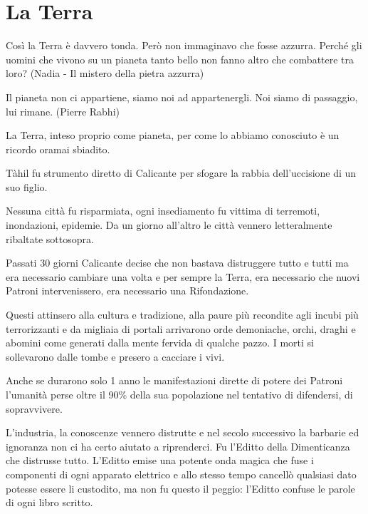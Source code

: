 \section{La Terra}

\begin{enfasi}{
Così la Terra è davvero tonda. Però non immaginavo che fosse azzurra. Perché gli uomini che vivono su un pianeta tanto bello non fanno altro che combattere tra loro? (Nadia - Il mistero della pietra azzurra)

\medskip

Il pianeta non ci appartiene, siamo noi ad appartenergli. Noi siamo di passaggio, lui rimane. (Pierre Rabhi)}\end{enfasi}

\begin{multicols}{2}

\label{terra}

La Terra, inteso proprio come pianeta, per come lo abbiamo conosciuto è un ricordo oramai sbiadito.

Tàhil fu strumento diretto di Calicante per sfogare la rabbia dell'uccisione di un suo figlio.

Nessuna città fu risparmiata, ogni insediamento fu vittima di terremoti, inondazioni, epidemie. Da un giorno all'altro le città vennero letteralmente ribaltate sottosopra.

Passati 30 giorni Calicante decise che non bastava distruggere tutto e tutti ma era necessario cambiare una volta e per sempre la Terra, era necessario che nuovi Patroni intervenissero, era necessario una Rifondazione.

Questi attinsero alla cultura e tradizione, alla paure più recondite agli incubi più terrorizzanti e da migliaia di portali arrivarono orde demoniache, orchi, draghi e abomini come generati dalla mente fervida di qualche pazzo. I morti si sollevarono dalle tombe e presero a cacciare i vivi.

Anche se durarono solo 1 anno le manifestazioni dirette di potere dei Patroni l'umanità perse oltre il 90\% della sua popolazione nel tentativo di difendersi, di sopravvivere.

L'industria, la conoscenze vennero distrutte e nel secolo successivo la barbarie ed ignoranza non ci ha certo aiutato a riprenderci.
Fu l'Editto della Dimenticanza che distrusse tutto. L'Editto emise una potente onda magica che fuse i componenti di ogni apparato elettrico e allo stesso tempo cancellò qualsiasi dato potesse essere li custodito, ma non fu questo il peggio: l'Editto confuse le parole di ogni libro scritto.


\end{multicols}
